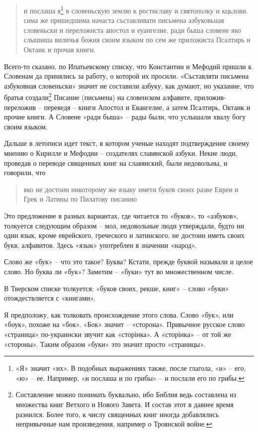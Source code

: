 \documentclass[a5paper,11pt,openany]{article}
\begin{document}
\begin{quotation}
и послаша я\footnote{«Я» значит «их». В подобных выражениях также, после глагола, «и» – его, «ю» – ее. Например, «и послаша и по грибы» – и послали его по грибы.} в словеньскую землю к ростиславу и святополку и кцьлови. сима же пришедшима начаста съставливати письмена азбуковьная словеньски и переложиста апостол и еуангелие, ради быша словене яко слышиша виличья божия своим языком по сем же приложиста Псалтирь и Октаик и прочая книги.
\end{quotation}

Всего-то сказано, по Ипатьевскому списку, что Константин и Мефодий пришли к Словенам да принялись за работу, о которой их просили.  «Съставляти письмена азбуковная словеньски» значит не составили азбуку, как думают, но указание, что братья создали\footnote{Составление можно понимать буквально, ибо Библия ведь составлена из множества книг Ветхого и Нового Завета. И состав этот в давнее время разнился. Более того, к числу священных книг иногда добавлялись непривычные нам произведения, например о Троянской войне.} Писание (письмена) на словенском алфавите, приложив-переложив – переведя – книги Апостол и Евангелие, а затем Псалтирь, Октаик и прочие книги. А Словене «ради быша» – рады были, что услышали хвалу богу своим языком. 

Дальше в летописи идет текст, в котором ученые находят подтверждение своему мнению о Кирилле и Мефодии – создателях славянской азбуки. Некие люди, проведав о переводе священных книг на славянский, были недовольны, и говорили, что

\begin{quotation}
яко не достоин никоторому же языку имети буков своих разве Евреи и Грек и Латины по Пилатову писанию
\end{quotation}

Это предложение в разных вариантах, где читается то «буков», то «азбуков», толкуется следующим образом – мол, недовольные люди утверждали, будто ни один язык, кроме еврейского, греческого и латинского, не достоин иметь своих букв, алфавитов. Здесь «язык» употреблен в значении «народ». 

Слово же «бук» – что это такое? Буква? Кстати, прежде буквой называли и целое слово. Но буква ли «бук»? Заметим – «буки» тут во множественном числе.

В Тверском списке толкуется: «буков своих, рекше, книг» – слово «буки» отождествляется с «книгами».

Я предположу, как толковать происхождение этого слова. Слово «бук», или «боук», похоже на «бок». «Бок» значит – «сторона». Привычное русское слово «страница» по-украински звучит как «сторінка». А «сторінка» – от той же «стороны». Таким образом «буки» это значит просто «страницы».
\end{document}

